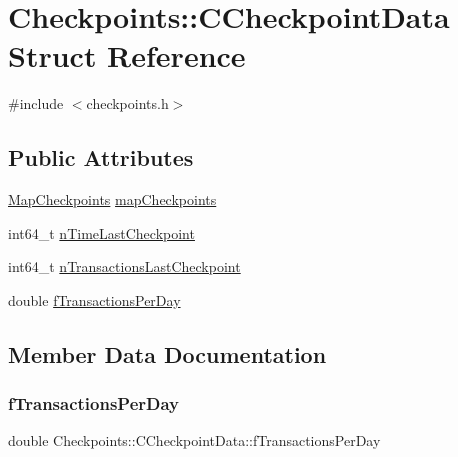 \hypertarget{struct_checkpoints_1_1_c_checkpoint_data}{}\section{Checkpoints\+:\+:C\+Checkpoint\+Data Struct Reference}
\label{struct_checkpoints_1_1_c_checkpoint_data}


{\ttfamily \#include $<$checkpoints.\+h$>$}

\subsection*{Public Attributes}
\begin{DoxyCompactItemize}
\item 
\mbox{\hyperlink{namespace_checkpoints_a996cca530c4568a2eb4516e8f351b9a2}{Map\+Checkpoints}} \mbox{\hyperlink{struct_checkpoints_1_1_c_checkpoint_data_a95ec9ac2bcb83c6cfa21097477dcc51e}{map\+Checkpoints}}
\item 
int64\+\_\+t \mbox{\hyperlink{struct_checkpoints_1_1_c_checkpoint_data_a49124425a3f9ccddba8bce3dd67ad3b3}{n\+Time\+Last\+Checkpoint}}
\item 
int64\+\_\+t \mbox{\hyperlink{struct_checkpoints_1_1_c_checkpoint_data_ad659d70f627b0c4529fc0e71f568de70}{n\+Transactions\+Last\+Checkpoint}}
\item 
double \mbox{\hyperlink{struct_checkpoints_1_1_c_checkpoint_data_a9119b43d2bc8e47df84f14c230a1762d}{f\+Transactions\+Per\+Day}}
\end{DoxyCompactItemize}


\subsection{Member Data Documentation}
\mbox{\label{struct_checkpoints_1_1_c_checkpoint_data_a9119b43d2bc8e47df84f14c230a1762d}} 
\subsubsection{\texorpdfstring{f\+Transactions\+Per\+Day}{fTransactionsPerDay}}
{\footnotesize\ttfamily double Checkpoints\+::\+C\+Checkpoint\+Data\+::f\+Transactions\+Per\+Day}

